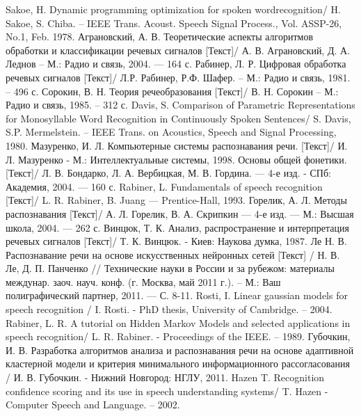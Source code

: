 \documentclass[a4paper,14pt,russian,utf8,nocolumnsxix,nocolumnxxxi,nocolumnxxxii]{eskdtext}
\begin{document}
\pagebreak
\begin{thebibliography}{99}

Sakoe, H. Dynamic programming optimization for spoken wordrecognition/ H. Sakoe, S. Chiba. – IEEE Trans. Acoust. Speech Signal Process., Vol. ASSP-26, No.1, Feb. 1978.
Аграновский, А. В. Теоретические аспекты алгоритмов обработки и классификации речевых сигналов [Текст]/ А. В. Аграновский, Д. А. Леднов – М.: Радио и связь, 2004. --- 164 с.
Рабинер, Л. Р. Цифровая обработка речевых сигналов [Текст]/ Л.Р. Рабинер, Р.Ф. Шафер. – М.: Радио и связь, 1981. – 496 с.
Сорокин, В. Н. Теория речеобразования [Текст]/ В. Н. Сорокин – М.: Радио и связь, 1985. – 312 с.
Davis, S. Comparison of Parametric Representations for Monosyllable Word Recognition in Continuously Spoken Sentences/ S. Davis, S.P. Mermelstein. – IEEE Trans. on Acoustics, Speech and Signal Processing, 1980.
Мазуренко, И. Л. Компьютерные системы распознавания речи. [Текст]/ И. Л. Мазуренко - М.: Интеллектуальные системы, 1998.
Основы общей фонетики. [Текст]/ Л. В. Бондарко, Л. А. Вербицкая, М. В. Гордина. --- 4-е изд. - СПб: Академия, 2004. --- 160 с.
Rabiner, L. Fundamentals of speech recognition [Текст]/ L. R. Rabiner, B. Juang --- Prentice-Hall, 1993.
Горелик, А. Л. Методы распознавания [Текст]/ А. Л. Горелик, В. А. Скрипкин --- 4-е изд. --- М.: Высшая школа, 2004. --- 262 с.
	Винцюк, Т. К. Анализ, распространение и интерпретация речевых сигналов [Текст]/ Т. К. Винцюк. - Киев: Наукова думка, 1987.
	Ле Н. В. Распознавание речи на основе искусственных нейронных сетей [Текст] / Н. В. Ле, Д. П. Панченко // Технические науки в России и за рубежом: материалы междунар. заоч. науч. конф. (г. Москва, май 2011 г.).  -- М.: Ваш полиграфический партнер, 2011. — С. 8-11.
Rosti, I. Linear gaussian models for speech recognition / I. Rosti. - PhD thesis, University of Cambridge. – 2004.
Rabiner, L. R. A tutorial on Hidden Markov Models and
selected applications in speech recognition/ L. R. Rabiner. - Proceedings of the IEEE. – 1989.
Губочкин, И. В. Разработка алгоритмов анализа и распознавания речи на основе адаптивной кластерной модели и критерия минимального информационного рассогласования / И. В. Губочкин. - Нижний Новгород: НГЛУ, 2011.
Hazen T. Recognition confidence scoring and its use in speech understanding systems/ T. Hazen - Computer Speech and Language. – 2002.

\end{thebibliography}
\end{document}
